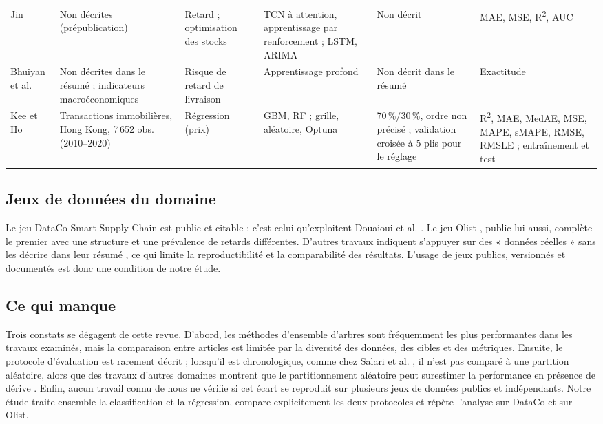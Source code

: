 \documentclass[11pt,a4paper]{article}
\theoremstyle{definition}
\begin{document}
\begin{table}[!htbp]
\begin{tabularx}{\textwidth}{@{}L{2.0cm}L{2.5cm}L{2.2cm}L{2.7cm}L{2.0cm}>{\raggedright\arraybackslash}X@{}}
Jin \cite{jin2025attention} & Non décrites (prépublication) & Retard ; optimisation des stocks & TCN à attention, apprentissage par renforcement ; LSTM, ARIMA & Non décrit & MAE, MSE, R\textsuperscript{2}, AUC \\
Bhuiyan et al. \cite{bhuiyan2026deep} & Non décrites dans le résumé ; indicateurs macroéconomiques & Risque de retard de livraison & Apprentissage profond & Non décrit dans le résumé & Exactitude \\\midrule
Kee et Ho \cite{kee2025optimizing} & Transactions immobilières, Hong Kong, 7\,652 obs. (2010--2020) & Régression (prix) & GBM, RF ; grille, aléatoire, Optuna & 70\,\%/30\,\%, ordre non précisé ; validation croisée à 5 plis pour le réglage & R\textsuperscript{2}, MAE, MedAE, MSE, MAPE, sMAPE, RMSE, RMSLE ; entraînement et test \\
\bottomrule
\end{tabularx}
\end{table}

\subsection{Jeux de données du domaine}
\label{sec:rw-donnees}

Le jeu DataCo Smart Supply Chain \cite{constante2019dataco} est public et citable ; c'est celui qu'exploitent Douaioui et al. \cite{douaioui2024enhancing}. Le jeu Olist \cite{olist2018brazilian}, public lui aussi, complète le premier avec une structure et une prévalence de retards différentes. D'autres travaux indiquent s'appuyer sur des « données réelles » sans les décrire dans leur résumé \cite{rezki2024machine}, ce qui limite la reproductibilité et la comparabilité des résultats. L'usage de jeux publics, versionnés et documentés est donc une condition de notre étude.

\subsection{Ce qui manque}
\label{sec:rw-lacune}

Trois constats se dégagent de cette revue. D'abord, les méthodes d'ensemble d'arbres sont fréquemment les plus performantes dans les travaux examinés, mais la comparaison entre articles est limitée par la diversité des données, des cibles et des métriques. Ensuite, le protocole d'évaluation est rarement décrit ; lorsqu'il est chronologique, comme chez Salari et al. \cite{salari2022realtime}, il n'est pas comparé à une partition aléatoire, alors que des travaux d'autres domaines montrent que le partitionnement aléatoire peut surestimer la performance en présence de dérive \cite{cerqueira2020evaluating}. Enfin, aucun travail connu de nous ne vérifie si cet écart se reproduit sur plusieurs jeux de données publics et indépendants. Notre étude traite ensemble la classification et la régression, compare explicitement les deux protocoles et répète l'analyse sur DataCo et sur Olist.
\end{document}
